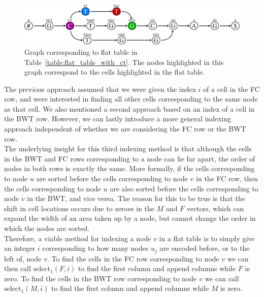 \documentclass[a4paper,12pt,twoside,BCOR=10mm]{scrbook}
\begin{document}
\begin{figure}[!htb]
\centering
\includegraphics[width=\textwidth]{evo_fig_flat_table_with_ct.pdf}
\caption[Graph corresponding to a flat table]{Graph corresponding to flat table in Table~\ref{table:flat_table_with_ct}. The nodes highlighted in this graph correspond to the cells highlighted in the flat table.} \label{fig:evo_fig_flat_table_with_ct}
\end{figure}

The previous approach assumed that we were given the index $ i $ of a cell in the FC row,
and were interested in finding all other cells corresponding to the same node as that cell.
We also mentioned a second approach based on an index of a cell in the BWT row.
However, we can lastly introduce a more general indexing approach independent of whether we
are considering the FC row or the BWT row. \\
The underlying insight for this third indexing method is that although the cells in the BWT
and FC rows corresponding to a node can lie far apart, the order of nodes in both rows is exactly the same.
More formally, if the cells corresponding to node $ u $ are sorted before the cells corresponding to node $ v $ in
the FC row, then the cells corresponding to node $ u $ are also sorted before the cells corresponding to node $ v $ in
the BWT, and vice versa. The reason for this to be true is that the shift in cell locations occurs due to zeroes in
the $ M $ and $ F $ vectors, which can expand the width of an area taken up by a node, but cannot change the order
in which the nodes are sorted. \\
Therefore, a viable method for indexing a node $ v $ in a flat table
is to simply give an integer $ i $ corresponding to how many nodes $ u_j $ are encoded before, or to
the left of, node $ v $.
To find the cells in the FC row corresponding to node $ v $ we can then call $ \textrm{select}_1 ( F, i ) $ to
find the first column and append columns while $ F $ is zero.
To find the cells in the BWT row corresponding to node $ v $ we can call $ \textrm{select}_1 ( M, i ) $ to
find the first column and append columns while $ M $ is zero.
\end{document}
